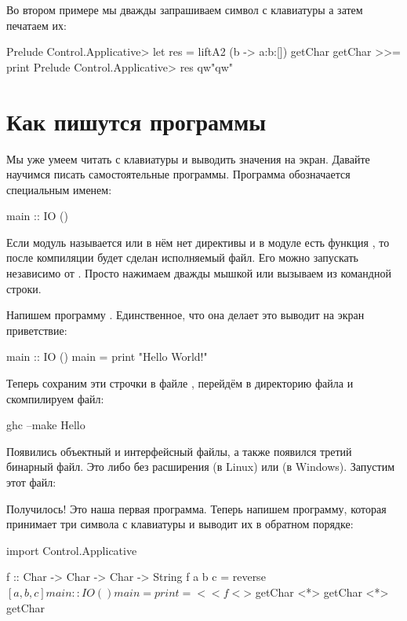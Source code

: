 Во втором примере мы дважды запрашиваем символ с клавиатуры
а затем печатаем их:

\begin{code}
Prelude Control.Applicative> let res = liftA2 (\a b -> a:b:[]) getChar getChar >>= print
Prelude Control.Applicative> res
qw"qw"
\end{code}

\section{Как пишутся программы}

Мы уже умеем читать с клавиатуры и выводить значения
на экран. Давайте научимся писать самостоятельные
программы. Программа обозначается специальным именем: 

\begin{code}
main :: IO ()
\end{code}

Если модуль называется  или в нём нет директивы 
 и в модуле есть функция ,
то после компиляции будет сделан исполняемый файл. Его можно запускать
независимо от . Просто нажимаем
дважды мышкой или вызываем из командной строки.

Напишем программу . Единственное, что
она делает это выводит на экран приветствие:

\begin{code}
main :: IO ()
main = print "Hello World!" 
\end{code}

Теперь сохраним эти строчки в файле , перейдём
в директорию файла и скомпилируем файл:

\begin{code}
ghc --make Hello
\end{code}

Появились объектный и интерфейсный файлы, а также появился 
третий бинарный файл. Это либо  без расширения 
(в Linux) или  (в Windows). Запустим этот файл:



Получилось! Это наша первая программа. Теперь напишем
программу, которая принимает три символа с клавиатуры
и выводит их в обратном порядке:

\begin{code}
import Control.Applicative

f :: Char -> Char -> Char -> String
f a b c = reverse $ [a,b,c]

main :: IO ()
main = print =<< f <$> getChar <*> getChar <*> getChar
\end{code}

